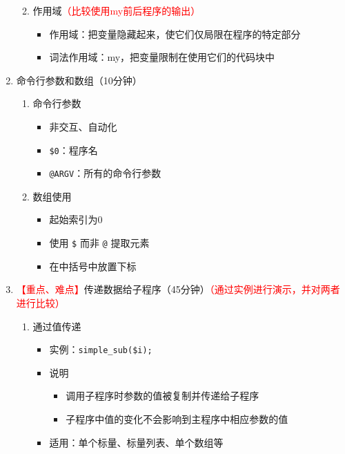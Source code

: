 \documentclass{TIJMUjiaoanLL}
\begin{document}
\begin{enumerate}
\begin{enumerate}
\begin{itemize}
	\end{itemize}
      \item 作用域\textcolor{red}{（比较使用my前后程序的输出）}
	\begin{itemize}
	  \item 作用域：把变量隐藏起来，使它们仅局限在程序的特定部分
	  \item 词法作用域：my，把变量限制在使用它们的代码块中
	\end{itemize}
    \end{enumerate}
  \item 命令行参数和数组（10分钟）
\vspace*{-1em}
\begin{multicols}{2}
    \begin{enumerate}
      \item 命令行参数
	\begin{itemize}
	  \item 非交互、自动化
	  \item \verb|$0|：程序名
	  \item \verb|@ARGV|：所有的命令行参数
	\end{itemize}
      \item 数组使用
	\begin{itemize}
	  \item 起始索引为0
	  \item 使用 \verb|$| 而非 \verb|@| 提取元素
	  \item 在中括号中放置下标
	\end{itemize}
    \end{enumerate}
\end{multicols}
\vspace*{-1em}
  \item \textcolor{red}{【重点、难点】}传递数据给子程序（45分钟）\textcolor{red}{（通过实例进行演示，并对两者进行比较）}
    \begin{enumerate}
      \item 通过值传递
	\begin{itemize}
	  \item 实例：\verb|simple_sub($i);|
	  \item 说明
	    \begin{itemize}
	      \item 调用子程序时参数的值被复制并传递给子程序
	      \item 子程序中值的变化不会影响到主程序中相应参数的值
	    \end{itemize}
	  \item 适用：单个标量、标量列表、单个数组等

\end{itemize}
\end{enumerate}
\end{enumerate}
\end{document}
